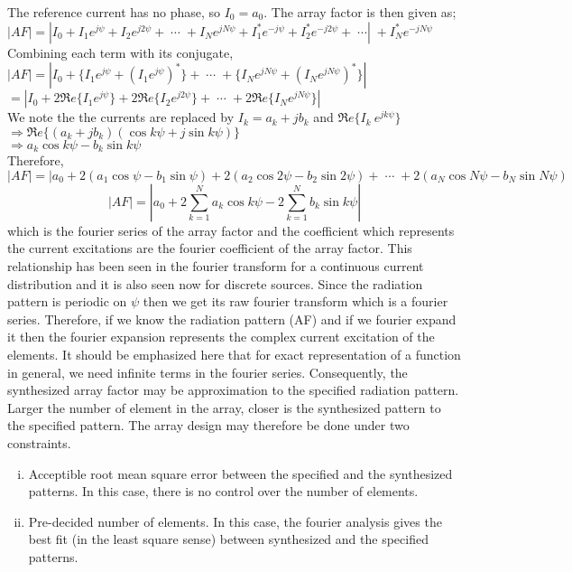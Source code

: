 The reference current has no phase, so $I_0 = a_0$. The array factor is then given as;\\
$|AF| = |I_0 + I_1 e^{j\psi} + I_2 e^{j2\psi} + \; \cdots \; + I_N e^{jN\psi} + I_1^\ast e^{-j\psi} + I_2^\ast e^{-j2\psi} + \; \cdots|\; + I_N^\ast e^{-jN\psi}$\\
Combining each term with its conjugate,\\
$|AF| = |I_0 + \{I_1 e^{j\psi} + (I_1 e^{j\psi})^\ast\} + \; \cdots \; + \{I_N e^{jN\psi} + (I_N e^{jN\psi})^\ast\}|$\\
$= |I_0 + 2\Re e\{I_1 e^{j\psi}\} + 2\Re e\{I_2 e^{j2\psi}\} + \; \cdots \; + 2\Re e\{I_N e^{jN\psi}\}|$\\
We note the the currents are replaced by $I_k = a_k + jb_k $ and $\Re e\{I_k\ e^{jk\psi}\}$\\
$\Rightarrow \Re e\{(a_k + jb_k)(\cos k\psi + j\sin k\psi)\}$\\
$\Rightarrow a_k\cos k\psi - b_k\sin k\psi$\\
Therefore,
\begin{dmath*}
|AF| = |a_0 + 2(a_1\cos\psi - b_1\sin\psi) + 2(a_2\cos2\psi - b_2\sin 2\psi) + \; \cdots \; + 2(a_N\cos N\psi - b_N\sin N\psi)
\end{dmath*}
\begin{dmath}
|AF| = \left|a_0 + 2\sum_{k=1}^{N} a_k\cos k\psi -2\sum_{k=1}^{N}b_k\sin k\psi\right|
\label{eqn56}
\end{dmath}
which is the fourier series of the array factor and the coefficient which represents the current excitations are the fourier coefficient of the array factor. This relationship has been seen in the fourier transform for a continuous current distribution and it is also seen now for discrete sources. Since the radiation pattern is periodic on $\psi$ then we get its raw fourier transform which is a fourier series. Therefore, if we know the radiation pattern (AF) and if we fourier expand it then the fourier expansion represents the complex current excitation of the elements. It should be emphasized here that for exact representation of a function in general, we need infinite terms in the fourier series. Consequently, the synthesized array factor may be  approximation  to the specified radiation pattern. Larger the number of element in the array, closer is the synthesized pattern to the specified pattern. The array design may therefore be done under two constraints.
\begin{enumerate}[(i)]
\item Acceptible root mean square error between the specified and the synthesized patterns. In this case, there is no control over the number of elements.
\item Pre-decided number of elements. In this case, the fourier analysis gives the best fit (in the least square sense) between synthesized and the specified patterns.
\end{enumerate}
